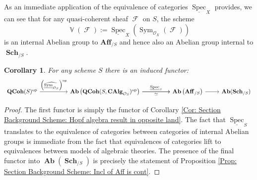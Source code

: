 \documentclass{amsart}
\newtheorem{corollary}[equation]{Corollary}
\theoremstyle{definition}
\DeclareMathOperator{\Fscr}{\mathscr{F}}
\DeclareMathOperator{\Vbb}{\mathbb{V}}
\DeclareMathOperator{\Ocal}{\mathcal{O}}
\DeclareMathOperator{\sym}{Sym}
\DeclareMathOperator{\Ab}{\mathbf{Ab}}
\DeclareMathOperator{\op}{op}
\DeclareMathOperator{\Spec}{Spec}
\newcommand{\CAlg}[1]{\mathbf{CAlg}_{#1}}
\newcommand{\Sym}[1]{\sym_{#1}}
\newcommand{\RelSpec}[1]{\underline{\Spec}_{#1}}
\newcommand{\RelSym}[1]{\underline{\sym}_{{#1}}}
\DeclareMathOperator{\Sch}{\mathbf{Sch}}
\DeclareMathOperator{\QCoh}{\mathbf{QCoh}}
\numberwithin{equation}{subsection}
\begin{document}
As an immediate application of the equivalence of categories $\RelSpec{X}$ provides, we can see that for any quasi-coherent sheaf $\Fscr$ on $S$, the scheme
\[
\Vbb(\Fscr) := \underline{\Spec}_X\left(\Sym{\Ocal_X}(\Fscr)\right)
\] 
is an internal Abelian group to $\mathbf{Aff}_{/S}$ and hence also an Abelian group internal to $\Sch_{/S}$.
\begin{corollary}\label{Cor: Section Background Scheme: Relative Spec of Relative Sym is functor into Ab Sch}
For any scheme $S$ there is an induced functor:
\[
\begin{tikzcd}
\QCoh(S)^{\op} \ar[rr]{}{\left(\widehat{\RelSym{\Ocal_S}}\right)^{\op}} & & \Ab\left(\QCoh(S,\CAlg{\Ocal_S})^{\op}\right) \ar[rr]{}{\RelSpec{S}} \ar[rr, swap]{}{\simeq} & & \Ab\left(\mathbf{Aff}_{/S}\right) \ar[r] & \Ab(\Sch_{/S})
\end{tikzcd}
\]
\end{corollary}
\begin{proof}
The first functor is simply the functor of Corollary \ref{Cor: Section Background Scheme: Hopf algebra result in opposite land}. The fact that $\RelSpec{S}$ translates to the equivalence of categories between categories of internal Abelian groups is immediate from the fact that equivalences of categories lift to equivalences between models of algebraic theories. The presence of the final functor into $\Ab(\Sch_{/S})$ is precisely the statement of Proposition \ref{Prop: Section Background Scheme: Incl of Aff is cont}.
\end{proof}
\end{document}

